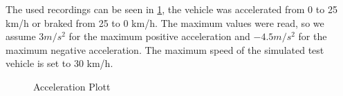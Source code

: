 \documentclass[11pt,oneside,openright]{mpreport}
\begin{document}
The used recordings can be seen in \cref{max_accel}, the vehicle was accelerated from 0 to 25 km/h or braked from 25 to 0 km/h.
The maximum values were read, so we assume $ 3m/{s^2} $ for the maximum positive acceleration and $ -4.5m/{s ^ 2} $ for the maximum negative acceleration.
The maximum speed of the simulated test vehicle is set to 30 km/h.




\begin{figure}[!ht]
\caption{Acceleration Plott}
\begin{center}
\label{max_accel}
\end{center}
\end{figure}

\end{document}
